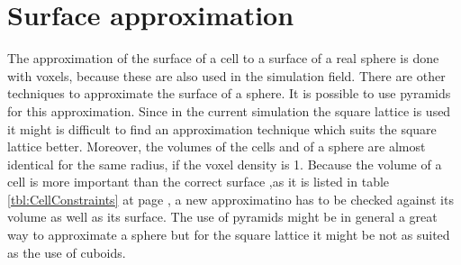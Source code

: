 \section{Surface approximation}
The approximation of the surface of a cell to a surface of a real sphere is done with voxels, because these are also used in the simulation field. There are other techniques to approximate the surface of a sphere. It is possible to use pyramids for this approximation. Since in the current simulation the square lattice is used it might is difficult to find an approximation technique which suits the square lattice better. Moreover, the volumes of the cells and of a sphere are almost identical for the same radius, if the voxel density is 1. Because the volume of a cell is more important than the correct surface ,as it is listed in table \ref{tbl:CellConstraints} at page \pageref{tbl:CellConstraints}, a new approximatino has to be checked against its volume as well as its surface. The use of pyramids might be in general a great way to approximate a sphere but for the square lattice it might be not as suited as the use of cuboids.

